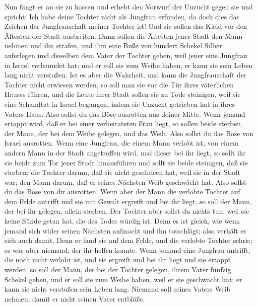 Nun fängt er an sie zu hassen und erhebt den Vorwurf der Unzucht gegen
sie und spricht: Ich habe deine Tochter nicht als Jungfrau erfunden, da
doch dies das Zeichen der Jungfrauschaft meiner Tochter ist! Und sie
sollen das Kleid vor den Ältesten der Stadt ausbreiten. 
Dann sollen die Ältesten jener Stadt den Mann nehmen und ihn strafen,
 und ihm eine Buße von hundert Schekel Silber auferlegen
und dieselben dem Vater der Tochter geben, weil jener eine Jungfrau in
Israel verleumdet hat; und er soll sie zum Weibe haben, er kann sie sein
Leben lang nicht verstoßen.  Ist es aber die Wahrheit,
und kann die Jungfrauschaft der Tochter nicht erwiesen werden,
 so soll man sie vor die Tür ihres väterlichen Hauses
führen, und die Leute ihrer Stadt sollen sie zu Tode steinigen, weil sie
eine Schandtat in Israel begangen, indem sie Unzucht getrieben hat in
ihres Vaters Haus. Also sollst du das Böse ausrotten aus deiner Mitte.
 Wenn jemand ertappt wird, daß er bei einer verheirateten
Frau liegt, so sollen beide sterben, der Mann, der bei dem Weibe
gelegen, und das Weib. Also sollst du das Böse von Israel ausrotten.
 Wenn eine Jungfrau, die einem Mann verlobt ist, von
einem andern Mann in der Stadt angetroffen wird, und dieser bei ihr
liegt,  so sollt ihr sie beide zum Tor jener Stadt
hinausführen und sollt sie beide steinigen, daß sie sterben: die Tochter
darum, daß sie nicht geschrieen hat, weil sie in der Stadt war; den Mann
darum, daß er seines Nächsten Weib geschwächt hat. Also sollst du das
Böse von dir ausrotten.  Wenn aber der Mann die verlobte
Tochter auf dem Felde antrifft und sie mit Gewalt ergreift und bei ihr
liegt, so soll der Mann, der bei ihr gelegen, allein sterben.
 Der Tochter aber sollst du nichts tun, weil sie keine
Sünde getan hat, die des Todes würdig ist. Denn es ist gleich, wie wenn
jemand sich wider seinen Nächsten aufmacht und ihn totschlägt; also
verhält es sich auch damit.  Denn er fand sie auf dem
Felde, und die verlobte Tochter schrie; es war aber niemand, der ihr
helfen konnte.  Wenn jemand eine Jungfrau antrifft, die
noch nicht verlobt ist, und sie ergreift und bei ihr liegt und sie
ertappt werden,  so soll der Mann, der bei der Tochter
gelegen, ihrem Vater fünfzig Schekel geben, und er soll sie zum Weibe
haben, weil er sie geschwächt hat; er kann sie nicht verstoßen sein
Leben lang.  Niemand soll seines Vaters Weib nehmen,
damit er nicht seinen Vater entblöße.

